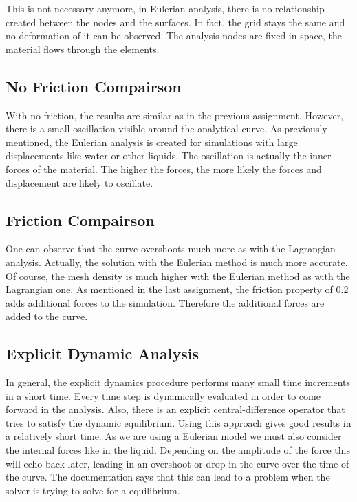 \documentclass[12pt]{article}
\begin{document}
This is not necessary anymore, in Eulerian analysis, there is no relationship created between the nodes and the surfaces. In fact, the grid stays the same and no deformation of it can be observed. The analysis nodes are fixed in space, the material flows through the elements.

\subsection{No Friction Compairson}

With no friction, the results are similar as in the previous assignment. However, there is a small oscillation visible around the analytical curve. As previously mentioned, the Eulerian analysis is created for simulations with large displacements like water or other liquids. The oscillation is actually the inner forces of the material. The higher the forces, the more likely the forces and displacement are likely to oscillate.

\subsection{Friction Compairson}

One can observe that the curve overshoots much more as with the Lagrangian analysis. Actually, the solution with the Eulerian method is much more accurate. Of course, the mesh density is much higher with the Eulerian method as with the Lagrangian one. As mentioned in the last assignment, the friction property of 0.2 adds additional forces to the simulation. Therefore the additional forces are added to the curve.

\subsection{Explicit Dynamic Analysis}

In general, the explicit dynamics procedure performs many small time increments in a short time. Every time step is dynamically evaluated in order to come forward in the analysis. Also, there is an explicit central-difference operator that tries to satisfy the dynamic equilibrium. Using this approach gives good results in a relatively short time. As we are using a Eulerian model we must also consider the internal forces like in the liquid. Depending on the amplitude of the force this will echo back later, leading in an overshoot or drop in the curve over the time of the curve. The documentation says that this can lead to a problem when the solver is trying to solve for a equilibrium.
\end{document}
